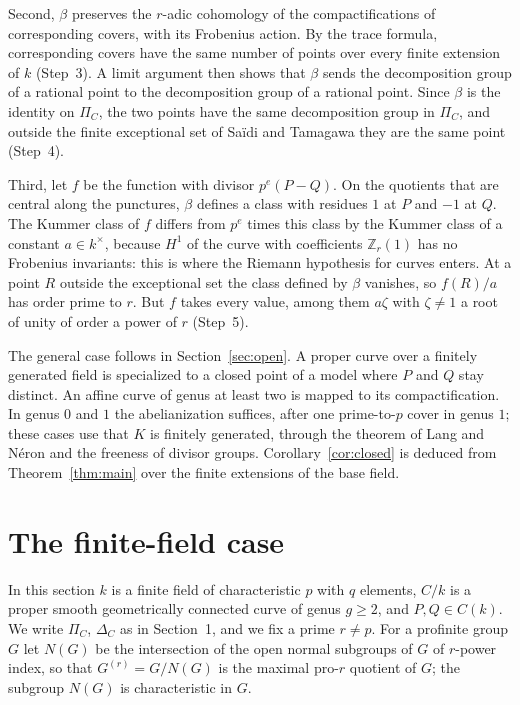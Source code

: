 \documentclass[11pt]{amsart}
\theoremstyle{remark}
\newcommand{\Z}{\mathbb Z}
\begin{document}
Second, $\beta$ preserves the $r$-adic cohomology of the compactifications of corresponding covers, with its Frobenius action. By the trace formula, corresponding covers have the same number of points over every finite extension of $k$ (Step~3). A limit argument then shows that $\beta$ sends the decomposition group of a rational point to the decomposition group of a rational point. Since $\beta$ is the identity on $\Pi_C$, the two points have the same decomposition group in $\Pi_C$, and outside the finite exceptional set of Sa\"idi and Tamagawa they are the same point (Step~4).

Third, let $f$ be the function with divisor $p^e(P-Q)$. On the quotients that are central along the punctures, $\beta$ defines a class with residues $1$ at $P$ and $-1$ at $Q$. The Kummer class of $f$ differs from $p^e$ times this class by the Kummer class of a constant $a\in k^\times$, because $H^1$ of the curve with coefficients $\Z_r(1)$ has no Frobenius invariants: this is where the Riemann hypothesis for curves enters. At a point $R$ outside the exceptional set the class defined by $\beta$ vanishes, so $f(R)/a$ has order prime to $r$. But $f$ takes every value, among them $a\zeta$ with $\zeta\ne1$ a root of unity of order a power of $r$ (Step~5).

The general case follows in Section~\ref{sec:open}. A proper curve over a finitely generated field is specialized to a closed point of a model where $P$ and $Q$ stay distinct. An affine curve of genus at least two is mapped to its compactification. In genus $0$ and $1$ the abelianization suffices, after one prime-to-$p$ cover in genus $1$; these cases use that $K$ is finitely generated, through the theorem of Lang and N\'eron and the freeness of divisor groups. Corollary~\ref{cor:closed} is deduced from Theorem~\ref{thm:main} over the finite extensions of the base field.

\section{The finite-field case}\label{sec:finite}

In this section $k$ is a finite field of characteristic $p$ with $q$ elements, $C/k$ is a proper smooth geometrically connected curve of genus $g\ge2$, and $P,Q\in C(k)$. We write $\Pi_C$, $\Delta_C$ as in Section~1, and we fix a prime $r\ne p$. For a profinite group $G$ let $N(G)$ be the intersection of the open normal subgroups of $G$ of $r$-power index, so that $G^{(r)}=G/N(G)$ is the maximal pro-$r$ quotient of $G$; the subgroup $N(G)$ is characteristic in $G$.
\end{document}

